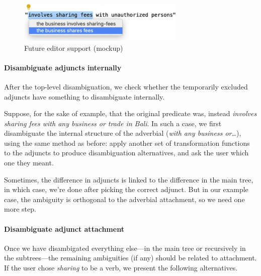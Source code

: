 \documentclass[11pt]{article}
\begin{document}
\begin{figure}[t]
\includegraphics[width=8cm]{images/ide-mockup.png}
\caption{Future editor support (mockup)}
\label{fig:ide}
\end{figure}


\paragraph{Disambiguate adjuncts internally}
After the top-level disambiguation, we check whether the temporarily excluded adjuncts have something to disambiguate internally. 



Suppose, for the sake of example, that the original predicate was, instead 
\textit{involves sharing fees with any business or trade in Bali}.
In such a case, we first disambiguate the internal structure of the adverbial (\textit{with any business or\dots}), using the same method as before:
apply another set of transformation functions to the adjuncts to produce disambiguation alternatives, and ask the user which one they meant.


Sometimes, the difference in adjuncts is linked to the difference in the main tree, in which case, we're done after picking the correct adjunct. But in our example case, the ambiguity is orthogonal to the adverbial attachment, so we need one more step.


\paragraph{Disambiguate adjunct attachment}
Once we have disambigated everything else---in the main tree or recursively in the subtrees---the remaining ambiguities (if any) should be related to attachment. If the user chose \textit{sharing} to be a verb, we present the following alternatives.
\end{document}
